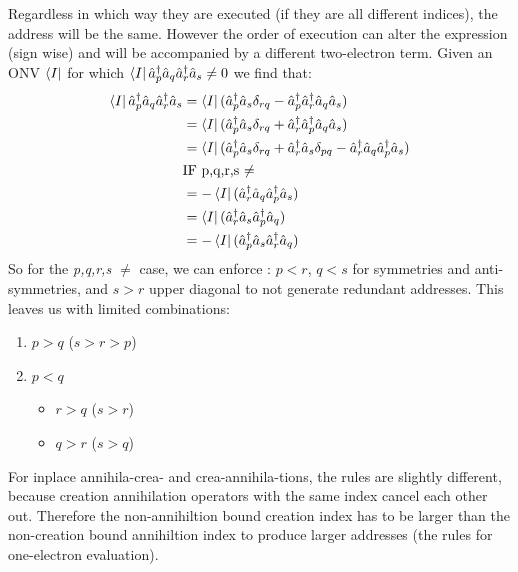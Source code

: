 Regardless in which way they are executed (if they are all different indices), the address will be the same. However the order of execution can alter the expression (sign wise) and will be accompanied by a different two-electron term. Given an ONV $\bra{I}$ for which $\bra{I} \hat{a}^\dagger_p \hat{a}_q \hat{a}^\dagger_r \hat{a}_s \neq 0 $ we find that:
\begin{align}
  \bra{I} \hat{a}^\dagger_p \hat{a}_q \hat{a}^\dagger_r \hat{a}_s & = \bra{I} (\hat{a}^\dagger_p \hat{a}_s \delta_{rq} - \hat{a}^\dagger_p \hat{a}^\dagger_r \hat{a}_q \hat{a}_s) \nonumber \\
  & = \bra{I} (\hat{a}^\dagger_p  \hat{a}_s \delta_{rq} + \hat{a}^\dagger_r \hat{a}^\dagger_p \hat{a}_q \hat{a}_s) \nonumber \\
  & = \bra{I} (\hat{a}^\dagger_p  \hat{a}_s \delta_{rq} + \hat{a}^\dagger_r \hat{a}_s \delta_{pq} - \hat{a}^\dagger_r \hat{a}_q \hat{a}^\dagger_p \hat{a}_s) \label{eq:equals} \\
  & \text{IF p,q,r,s $\neq$} \nonumber \\
  & = - \bra{I}(\hat{a}^\dagger_r \hat{a}_q \hat{a}^\dagger_p \hat{a}_s )\\
  & = \bra{I} (\hat{a}^\dagger_r \hat{a}_s \hat{a}^\dagger_p \hat{a}_q ) \\
  & = - \bra{I} (\hat{a}^\dagger_p \hat{a}_s \hat{a}^\dagger_r \hat{a}_q)
\end{align}
So for the \textit{p,q,r,s $\neq$} case, we can enforce : $p<r$, $q<s$ for symmetries and anti-symmetries, and $s > r$ upper diagonal to not generate redundant addresses. This leaves us with limited combinations:

\begin{enumerate}
  \item $p > q$ ($s > r > p$)
  \item $p < q$
  \begin{itemize}
    \item $r > q$ ($s > r$)
    \item $q > r$ ($s > q$)
  \end{itemize}
\end{enumerate}
For inplace annihila-crea- and crea-annihila-tions, the rules are slightly different, because creation annihilation operators with the same index cancel each other out. Therefore the non-annihiltion bound creation index has to be larger than the non-creation bound annihiltion index to produce larger addresses (the rules for one-electron evaluation).


